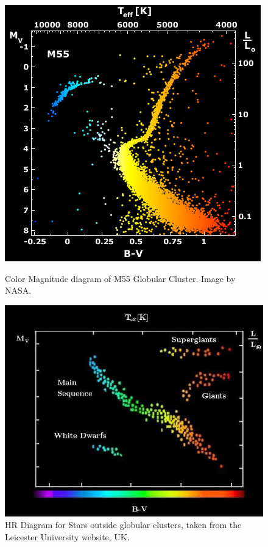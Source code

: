 \begin{figure}[H]
  \centering
  \begin{minipage}[b]{0.44\textwidth}
    \includegraphics[width=\textwidth]{images/m55_diagram.jpg}
    \caption[Color Magnitude diagram of M55]{Color Magnitude diagram of M55 Globular Cluster. Image by NASA.}
  \end{minipage}
  \hfill
  \begin{minipage}[b]{0.54\textwidth}
    \includegraphics[width=\textwidth]{images/hrcolour.jpg}
    \caption[HR Diagram for Stars]{HR Diagram for Stars outside globular clusters, taken from the Leicester University website, UK.}
  \end{minipage}
\end{figure}
 
